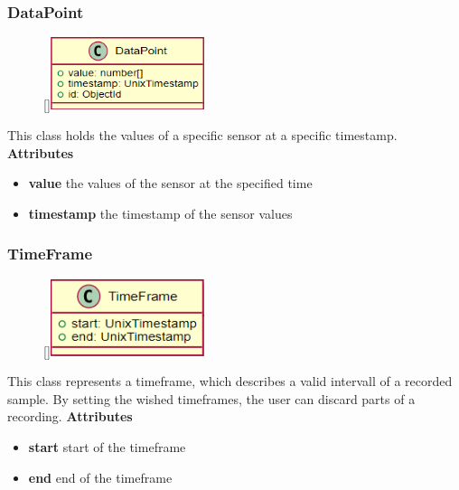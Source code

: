 \subsubsection{DataPoint}
\begin{figure}
    \raisebox{0pt}[\dimexpr{}\baselineskip\relax]{\includegraphics[width=4.5cm]{classes/workspace-management/9.png}}
\end{figure} 
\par
This class holds the values of a specific sensor at a specific timestamp.
\newline
\newline
\textbf{Attributes}
\begin{itemize}
    \item \textbf{value} the values of the sensor at the specified time
    \item \textbf{timestamp} the timestamp of the sensor values
\end{itemize}

\subsubsection{TimeFrame}
\begin{figure}
    \raisebox{0pt}[\dimexpr{}\baselineskip\relax]{\includegraphics[width=4.5cm]{classes/workspace-management/10.png}}
\end{figure} 
\par
This class represents a timeframe, which describes a valid intervall of a recorded sample. By setting the wished timeframes, the user can discard parts of a recording.
\newline
\newline
\textbf{Attributes}
\begin{itemize}
    \item \textbf{start} start of the timeframe
    \item \textbf{end} end of the timeframe
\end{itemize}

